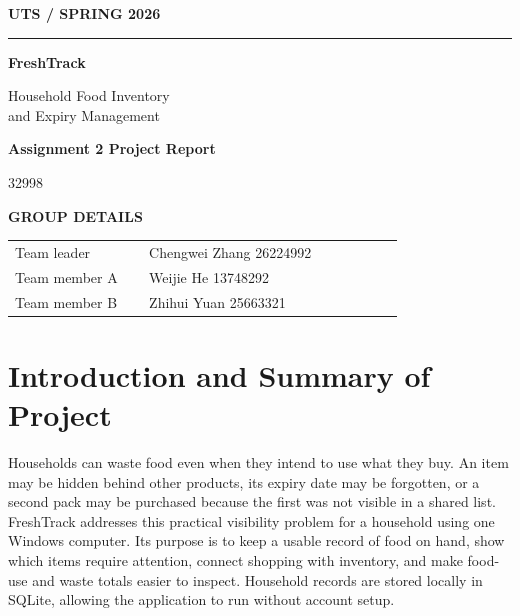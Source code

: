 \documentclass[11pt,a4paper]{article}
\begin{document}
\begin{titlepage}
\thispagestyle{empty}
\vspace*{1.15cm}
\begin{center}
  {\sffamily\bfseries\color{leaf}\fontsize{18}{22}\selectfont UTS \quad / \quad SPRING 2026}\par
  \vspace{0.45cm}
  {\color{leaf}\rule{0.26\linewidth}{2pt}}\par
  \vspace{1.8cm}
  {\sffamily\bfseries\color{forest}\fontsize{48}{52}\selectfont FreshTrack}\par
  \vspace{0.45cm}
  {\sffamily\color{muted}\fontsize{19}{24}\selectfont Household Food Inventory\\[3pt]and Expiry Management}\par
  \vspace{1.2cm}
  {\sffamily\bfseries\color{forest}\large Assignment 2 Project Report}\par
  \vspace{0.18cm}
  {\sffamily\color{muted}32998}\par
\end{center}
\vfill
\begin{tcolorbox}[enhanced,colback=mint,colframe=leaf!30!white,arc=3mm,boxrule=0.6pt,
  left=16pt,right=16pt,top=13pt,bottom=13pt]
  {\sffamily\bfseries\color{forest}GROUP DETAILS}\par\vspace{0.35cm}
  \begin{tabular}{@{}p{0.30\linewidth}p{0.58\linewidth}@{}}
    Team leader & Chengwei Zhang 26224992 \\[5pt]
    Team member A & Weijie He 13748292 \\[5pt]
    Team member B & Zhihui Yuan  25663321\\
  \end{tabular}
\end{tcolorbox}
\vspace{0.8cm}
\end{titlepage}
\setcounter{page}{1}

\section{Introduction and Summary of Project}

Households can waste food even when they intend to use what they buy. An item may be hidden behind other products, its expiry date may be forgotten, or a second pack may be purchased because the first was not visible in a shared list. FreshTrack addresses this practical visibility problem for a household using one Windows computer. Its purpose is to keep a usable record of food on hand, show which items require attention, connect shopping with inventory, and make food-use and waste totals easier to inspect. Household records are stored locally in SQLite, allowing the application to run without account setup.
\end{document}
